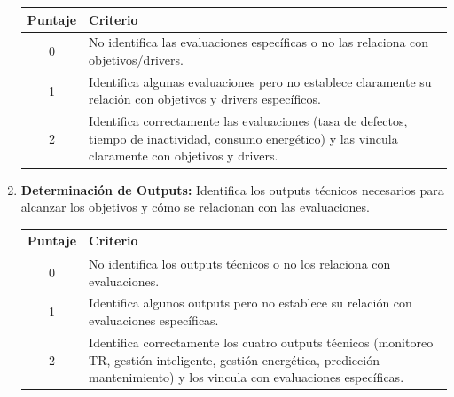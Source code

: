 \documentclass{article}
\begin{document}
\begin{enumerate}
    
    \begin{table}[h!]
    \centering
    \begin{tabular}{|c|p{10cm}|}
    \hline
    \textbf{Puntaje} & \textbf{Criterio} \\ \hline
    0 & No identifica las evaluaciones específicas o no las relaciona con objetivos/drivers. \\ \hline
    1 & Identifica algunas evaluaciones pero no establece claramente su relación con objetivos y drivers específicos. \\ \hline
    2 & Identifica correctamente las evaluaciones (tasa de defectos, tiempo de inactividad, consumo energético) y las vincula claramente con objetivos y drivers. \\ \hline
    \end{tabular}
    \end{table}

    \item \textbf{Determinación de Outputs:}
    Identifica los outputs técnicos necesarios para alcanzar los objetivos y cómo se relacionan con las evaluaciones.
    
    
    \begin{table}[h!]
    \centering
    \begin{tabular}{|c|p{10cm}|}
    \hline
    \textbf{Puntaje} & \textbf{Criterio} \\ \hline
    0 & No identifica los outputs técnicos o no los relaciona con evaluaciones. \\ \hline
    1 & Identifica algunos outputs pero no establece su relación con evaluaciones específicas. \\ \hline
    2 & Identifica correctamente los cuatro outputs técnicos (monitoreo TR, gestión inteligente, gestión energética, predicción mantenimiento) y los vincula con evaluaciones específicas. \\ \hline
    \end{tabular}
    \end{table}


\end{enumerate}
\end{document}
